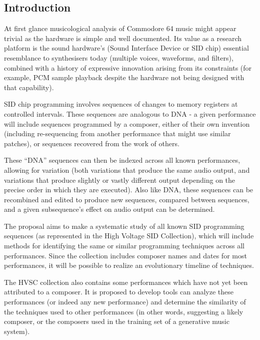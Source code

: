 \documentclass[10pt]{article}
\begin{document}
\begin{multicols*}{2}

  \section{Introduction}
  At first glance musicological analysis of Commodore 64 music might
  appear trivial as the hardware is simple and well documented. Its
  value as a research platform is the sound hardware's (Sound
  Interface Device or SID chip) essential resemblance to synthesisers
  today (multiple voices, waveforms, and filters), combined with a
  history of expressive innovation arising from its constraints (for
  example, PCM sample playback despite the hardware not being designed
  with that capability).

  SID chip programming involves sequences of changes to memory
  registers at controlled intervals. These sequences are analogous to
  DNA - a given performance will include sequences programmed by a
  composer, either of their own invention (including re-sequencing
  from another performance that might use similar patches), or
  sequences recovered from the work of others.

  These ``DNA'' sequences can then be indexed across all known
  performances, allowing for variation (both variations that produce
  the same audio output, and variations that produce slightly or
  vastly different output depending on the precise order in which they
  are executed). Also like DNA, these sequences can be recombined and
  edited to produce new sequences, compared between sequences, and a
  given subsequence's effect on audio output can be determined.

  The proposal aims to make a systematic study of all known SID
  programming sequences (as represented in the High Voltage SID
  Collection), which will include methods for identifying the same or
  similar programming techniques across all performances. Since the
  collection includes composer names and dates for most performances,
  it will be possible to realize an evolutionary timeline of
  techniques.

  The HVSC collection also contains some performances which have not
  yet been attributed to a composer. It is proposed to develop tools
  can analyze these performances (or indeed any new performance) and
  determine the similarity of the techniques used to other
  performances (in other words, suggesting a likely composer, or the
  composers used in the training set of a generative music system).


\end{multicols*}
\end{document}
